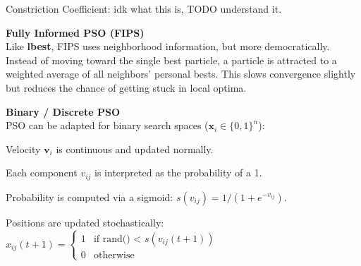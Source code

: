Constriction Coefficient: idk what this is, TODO understand it.

\textbf{Fully Informed PSO (FIPS)}\\
Like \textbf{lbest}, FIPS uses neighborhood information, but more democratically. 
Instead of moving toward the single best particle, a particle is attracted to a 
weighted average of all neighbors' personal bests. This slows convergence slightly 
but reduces the chance of getting stuck in local optima.

\textbf{Binary / Discrete PSO}\\
PSO can be adapted for binary search spaces ($\mathbf{x}_i \in \{0,1\}^n$):
\begin{tightitemize}
    \item Velocity $\mathbf{v}_i$ is continuous and updated normally.
    \item Each component $v_{ij}$ is interpreted as the probability of a 1.
    \item Probability is computed via a sigmoid: $s(v_{ij}) = 1/(1+e^{-v_{ij}})$.
    \item Positions are updated stochastically:
    $
        x_{ij}(t+1) = 
        \begin{cases} 
            1 & \text{if rand() < } s(v_{ij}(t+1)) \\ 
            0 & \text{otherwise} 
        \end{cases}
    $
\end{tightitemize}
